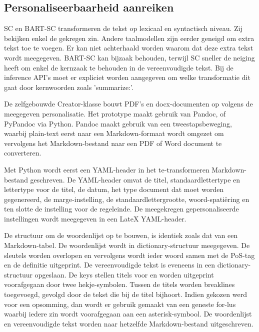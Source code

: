 \subsection{Personaliseerbaarheid aanreiken}

SC en BART-SC transformeren de tekst op lexicaal en syntactisch niveau. Zij bekijken enkel de gekregen zin. Andere taalmodellen zijn eerder geneigd om extra tekst toe te voegen. Er kan niet achterhaald worden waarom dat deze extra tekst wordt meegegeven. BART-SC kan bijzaak behouden, terwijl SC sneller de neiging heeft om enkel de kernzaak te behouden in de vereenvoudigde tekst. Bij de inference API's moet er expliciet worden aangegeven om welke transformatie dit gaat door kernwoorden zoals 'summarize:'.

\medspace

De zelfgebouwde Creator-klasse bouwt PDF's en docx-documenten op volgens de meegegeven personalisatie. Het prototype maakt gebruik van Pandoc, of PyPandoc via Python. Pandoc maakt gebruik van een tweestapsbeweging, waarbij plain-text eerst naar een Markdown-formaat wordt omgezet om vervolgens het Markdown-bestand naar een PDF of Word document te converteren.

\medspace

Met Python wordt eerst een YAML-header in het te-transformeren Markdown-bestand geschreven. De YAML-header omvat de titel, standaardlettertype en lettertype voor de titel, de datum, het type document dat moet worden gegenereerd, de marge-instelling, de standaardlettergrootte, woord-spatiëring en ten slotte de instelling voor de regeleinde. De meegekregen gepersonaliseerde instellingen wordt meegegeven in een LateX YAML-header.

\medspace

De structuur om de woordenlijst op te bouwen, is identiek zoals dat van een Markdown-tabel. De  woordenlijst wordt in dictionary-structuur meegegeven. De sleutels worden overlopen en vervolgens wordt ieder woord samen met de PoS-tag en de definitie uitgeprint. De vereenvoudigde tekst is eveneens in een dictionary-structuur opgeslaan. De keys stellen titels voor en worden uitgeprint voorafgegaan door twee hekje-symbolen. Tussen de titels worden breaklines toegevoegd, gevolgd door de tekst die bij de titel bijhoort. Indien gekozen werd voor een opsomming, dan wordt er gebruik gemaakt van een geneste for-lus waarbij iedere zin wordt voorafgegaan aan een asterisk-symbool. De woordenlijst en vereenvoudigde tekst worden naar hetzelfde Markdown-bestand uitgeschreven. 

